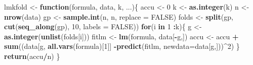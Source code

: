 \documentclass[
]{book}
\newenvironment{Shaded}{\begin{snugshade}}{\end{snugshade}}
\newcommand{\ControlFlowTok}[1]{\textcolor[rgb]{0.13,0.29,0.53}{\textbf{#1}}}
\newcommand{\DataTypeTok}[1]{\textcolor[rgb]{0.13,0.29,0.53}{#1}}
\newcommand{\DecValTok}[1]{\textcolor[rgb]{0.00,0.00,0.81}{#1}}
\newcommand{\KeywordTok}[1]{\textcolor[rgb]{0.13,0.29,0.53}{\textbf{#1}}}
\newcommand{\NormalTok}[1]{#1}
\newcommand{\OperatorTok}[1]{\textcolor[rgb]{0.81,0.36,0.00}{\textbf{#1}}}
\newcommand{\OtherTok}[1]{\textcolor[rgb]{0.56,0.35,0.01}{#1}}
\newcommand{\StringTok}[1]{\textcolor[rgb]{0.31,0.60,0.02}{#1}}
\theoremstyle{definition}
\theoremstyle{definition}
\theoremstyle{definition}
\theoremstyle{remark}
\begin{document}
\begin{Shaded}
\begin{Highlighting}[]
\NormalTok{lmkfold <-}\StringTok{ }\ControlFlowTok{function}\NormalTok{(formula, data, k, ...)\{}
\NormalTok{  accu <-}\StringTok{ }\DecValTok{0}
\NormalTok{  k <-}\StringTok{ }\KeywordTok{as.integer}\NormalTok{(k)}
\NormalTok{  n <-}\StringTok{ }\KeywordTok{nrow}\NormalTok{(data)}
\NormalTok{  gp <-}\StringTok{ }\KeywordTok{sample.int}\NormalTok{(n, n, }\DataTypeTok{replace =} \OtherTok{FALSE}\NormalTok{)}
\NormalTok{  folds <-}\StringTok{ }\KeywordTok{split}\NormalTok{(gp, }\KeywordTok{cut}\NormalTok{(}\KeywordTok{seq_along}\NormalTok{(gp), }\DecValTok{10}\NormalTok{, }\DataTypeTok{labels =} \OtherTok{FALSE}\NormalTok{))}
  \ControlFlowTok{for}\NormalTok{(i }\ControlFlowTok{in} \DecValTok{1} \OperatorTok{:}\NormalTok{k)\{}
\NormalTok{   g <-}\StringTok{ }\KeywordTok{as.integer}\NormalTok{(}\KeywordTok{unlist}\NormalTok{(folds[i]))}
\NormalTok{   fitlm <-}\StringTok{ }\KeywordTok{lm}\NormalTok{(formula, data[}\OperatorTok{-}\NormalTok{g,])}
\NormalTok{   accu <-}\StringTok{ }\NormalTok{accu }\OperatorTok{+}\StringTok{ }\KeywordTok{sum}\NormalTok{((data[g, }\KeywordTok{all.vars}\NormalTok{(formula)[}\DecValTok{1}\NormalTok{]] }\OperatorTok{-}\KeywordTok{predict}\NormalTok{(fitlm, }\DataTypeTok{newdata=}\NormalTok{data[g,]))}\OperatorTok{^}\DecValTok{2}\NormalTok{)}
\NormalTok{  \}}
\KeywordTok{return}\NormalTok{(accu}\OperatorTok{/}\NormalTok{n)}
\NormalTok{\}}


\end{Highlighting}
\end{Shaded}
\end{document}
